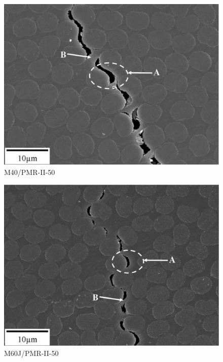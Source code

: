 % 
%               
%          
% 

\begin{subfigure}{0.32\linewidth}
  \setlength{\figwidth}{\linewidth}
  \centering
  \includegraphics[width=\figwidth,height=\figheight,keepaspectratio]{Exp_RVE_GentzM2004_M40-PMR-II-50}
  \caption{M40/PMR-II-50 \cite{GentzM2004}}%
  \label{fig:Exp:RVE:GentzM2004:M40}
\end{subfigure}%
\hfill
\begin{subfigure}{0.32\linewidth}
  \setlength{\figwidth}{\linewidth}
  \centering
  \includegraphics[width=\figwidth,height=\figheight,keepaspectratio]{Exp_RVE_GentzM2004_M60J-PMR-II-50}
  \caption{M60J/PMR-II-50 \cite{GentzM2004}}%
  \label{fig:Exp:RVE:GentzM2004:M60}
\end{subfigure}%
